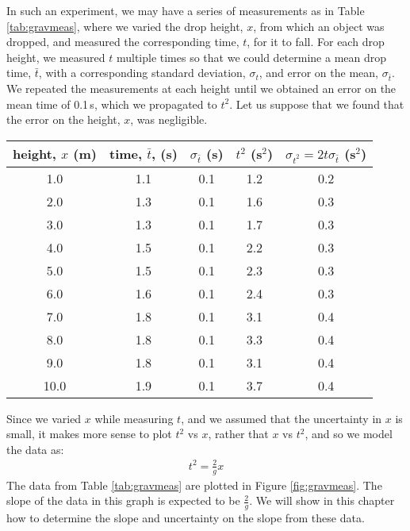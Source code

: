 In such an experiment, we may have a series of measurements as in Table \ref{tab:gravmeas}, where we varied the drop height, $x$, from which an object was dropped, and measured the corresponding time, $t$, for it to fall. For each drop height, we measured $t$ multiple times so that we could determine a mean drop time, $\bar t$, with a corresponding standard deviation, $\sigma_t$, and error on the mean, $\sigma_{\bar t}$. We repeated the measurements at each height until we obtained an error on the mean time of 0.1\,s, which we propagated to $t^2$. Let us suppose that we found that the error on the height, $x$, was negligible. 

\begin{center}
\begin{tabular}{|c|c|c|c|c|}
\hline
\textbf{height, $x$ (m)}&\textbf{time, $\bar t$, (s)}&\textbf{$\sigma_{\bar t}$ (s)}&\textbf{$t^2$ (s$^2$)}&\textbf{$\sigma_{t^2}=2t\sigma_{\bar t}$ (s$^2$)}\\
\hline
1.0 & 1.1 & 0.1 & 1.2 & 0.2 \\ 
\hline
2.0 & 1.3 & 0.1 & 1.6 & 0.3 \\ 
\hline
3.0 & 1.3 & 0.1 & 1.7 & 0.3 \\ 
\hline
4.0 & 1.5 & 0.1 & 2.2 & 0.3 \\ 
\hline
5.0 & 1.5 & 0.1 & 2.3 & 0.3 \\ 
\hline
6.0 & 1.6 & 0.1 & 2.4 & 0.3 \\ 
\hline
7.0 & 1.8 & 0.1 & 3.1 & 0.4 \\ 
\hline
8.0 & 1.8 & 0.1 & 3.3 & 0.4 \\ 
\hline
9.0 & 1.8 & 0.1 & 3.1 & 0.4 \\ 
\hline
10.0 & 1.9 & 0.1 & 3.7 & 0.4 \\ 
\hline
\end{tabular}
\end{center}
Since we varied $x$ while measuring $t$, and we assumed that the uncertainty in $x$ is small, it makes more sense to plot $t^2$ vs $x$, rather that $x$ vs $t^2$, and so we model the data as:
\begin{align}
\label{eqn:t2ofx}
t^2 = \frac{2}{g}x
\end{align}
The data from Table \ref{tab:gravmeas} are plotted in Figure \ref{fig:gravmeas}. The slope of the data in this graph is expected to be $\frac{2}{g}$. We will show in this chapter how to determine the slope and uncertainty on the slope from these data. 

